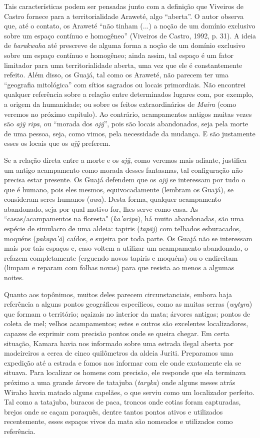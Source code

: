 Tais características podem ser pensadas junto com a definição que
Viveiros de Castro fornece para a territorialidade Araweté, algo
``aberta''. O autor observa que, até o contato, os Araweté ``não tinham
(...) a noção de um domínio exclusivo sobre um espaço contínuo e
homogêneo'' (Viveiros de Castro, 1992, p. 31). A ideia de
\emph{harakwaha} até prescreve de alguma forma a noção de um domínio
exclusivo sobre um espaço contínuo e homogêneo; ainda assim, tal espaço
é um fator limitador para uma territorialidade aberta, uma vez que ele é
constantemente refeito. Além disso, os Guajá, tal como os Araweté, não
parecem ter uma ``geografia mitológica'' com sítios sagrados ou locais
primordiais. Não encontrei qualquer referência sobre a relação entre
determinados lugares com, por exemplo, a origem da humanidade; ou sobre
os feitos extraordinários de \emph{Maira} (como veremos no próximo
capítulo). Ao contrário, acampamentos antigos muitas vezes são \emph{ajỹ
ripa}, ou ``morada dos \emph{ajỹ}'', pois são locais abandonados, seja
pela morte de uma pessoa, seja, como vimos, pela necessidade da mudança.
E são justamente esses os locais que os \emph{ajỹ} preferem.

Se a relação direta entre a morte e os \emph{ajỹ}, como veremos mais
adiante, justifica um antigo acampamento como morada desses fantasmas,
tal configuração não precisa estar presente. Os Guajá defendem que os
\emph{ajỹ} se interessam por tudo o que é humano, pois eles mesmos,
equivocadamente (lembram os Guajá), se consideram seres humanos
(\emph{awa}). Desta forma, qualquer acampamento abandonado, seja por
qual motivo for, lhes serve como casa. As ``casas/acampamentos na
floresta" (\emph{ka'aripa}), há muito abandonadas, são uma espécie de
simulacro de uma aldeia: tapiris (\emph{tapãj}) com telhados
esburacados, moquéns (\emph{pakapa'ã}) caídos, e sujeira por toda parte.
Os Guajá não se interessam mais por tais espaços e, caso voltem a
utilizar um acampamento abandonado, o refazem completamente (erguendo
novos tapiris e moquéns) ou o endireitam (limpam e reparam com folhas
novas) para que resista ao menos a algumas noites.

Quanto aos topônimos, muitos deles parecem circunstanciais, embora haja
referência a alguns pontos geográficos específicos, como as muitas
serras (\emph{wytyra}) que formam o território; açaizais no interior da
mata; árvores antigas; pontos de coleta de mel; velhos acampamentos;
estes e outros são excelentes localizadores, capazes de exprimir com
precisão pontos onde se queira chegar. Em certa situação, Kamara havia
nos informado sobre uma estrada ilegal aberta por madeireiros a cerca de
cinco quilômetros da aldeia Juriti. Preparamos uma expedição até a
estrada e fomos nos informar com ele onde exatamente ela se situava.
Para localizar os homens com precisão, ele responde que ela terminava
próximo a uma grande árvore de tatajuba (\emph{taryka}) onde alguns
meses atrás Wiraho havia matado alguns capelães, o que serviu como um
localizador perfeito. Tal como a tatajuba, buracos de paca, troncos onde
cotias foram capturadas, brejos onde se caçam poraquês, dentre tantos
pontos ativos e utilizados recentemente, esses espaços vivos da mata são
nomeados e utilizados como referência.

